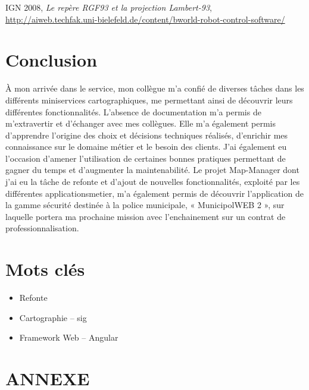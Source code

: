 \documentclass{rapportUHA40}
\begin{document}
\newpage
\printglossaries{}
\begin{thebibliography}{9}
  IGN 2008, \emph{Le repère RGF93 et la projection Lambert-93}, \url{http://aiweb.techfak.uni-bielefeld.de/content/bworld-robot-control-software/}
\end{thebibliography}
\newpage

\section*{Conclusion}
À mon arrivée dans le service, mon collègue m’a confié de diverses tâches dans
les différents miniservices cartographiques, me permettant ainsi de découvrir
leurs différentes fonctionnalités. L'absence de documentation m'a permis de
m’extravertir et d’échanger avec mes collègues. Elle m’a également permis
d’apprendre l’origine des choix et décisions techniques réalisés, d’enrichir mes
connaissance sur le domaine métier et le besoin des clients. J’ai également eu
l’occasion d’amener l’utilisation de certaines bonnes pratiques permettant de gagner
du temps et d’augmenter la maintenabilité. Le projet Map-Manager dont j'ai eu la
tâche de refonte et d'ajout de nouvelles fonctionnalités, exploité par les différentes
\gls{applicationsmetier}, m’a également permis de découvrir l’application de la
gamme sécurité destinée à la police municipale, « MunicipolWEB 2 », sur
laquelle portera ma prochaine mission avec l’enchainement sur un contrat de
professionnalisation.

\section*{Mots clés}
\begin{itemize}
  \item Refonte
  \item Cartographie – \gls{sig}
  \item Framework Web – Angular
\end{itemize}

\clearpage
\appendix
{}
\section*{ANNEXE}
\end{document}
